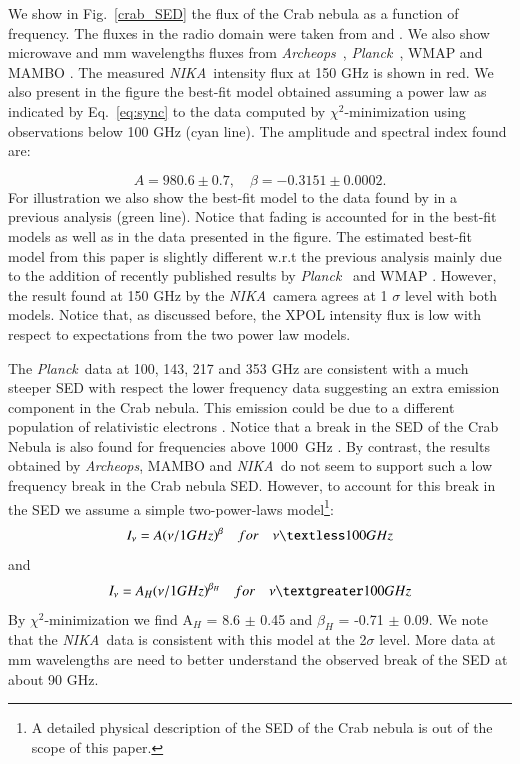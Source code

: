 \documentclass[twocolumn,traditabstract]{aa}
\def\NIKA{\textit{NIKA}}
\def\Archeops{\textit{Archeops}}
\def\Planck{\textit{Planck}}
\begin{document}
We show in Fig.~\ref{crab_SED} the flux of the Crab nebula as a function of frequency. The fluxes in the radio domain were taken from \cite{dmitrenko1970absolute} and \cite{1971IzVUZ..14..157V}. We also show microwave and mm wavelengths fluxes from \Archeops\ \citep{macias2007archeops}, \Planck\ \citep{2015arXiv150702058P}, WMAP \citep{2011ApJS..192...19W} and MAMBO \citep{2002A&A...386.1044B}. The measured \NIKA\ intensity flux at 150 GHz is shown in red.
We also present in the figure the best-fit model obtained assuming a power law as indicated by Eq.~\ref{eq:sync} to the data computed by $\chi^2$-minimization using observations below 100 GHz (cyan line). The amplitude and spectral index found are: 

\begin{equation}
 A = 980.6 \pm 0.7  ,\quad \beta = -0.3151 \pm 0.0002. 
 \end{equation}
 For illustration we also show the best-fit model to the data found by \cite{macias2010} in a previous analysis (green line). 
Notice that fading is accounted for in the best-fit models as well as in the data presented in the figure.
The estimated best-fit model from this paper is slightly different w.r.t the previous analysis mainly due to the addition of recently published results by \Planck\ \citep{2015arXiv150702058P} and  WMAP \citep{2011ApJS..192...19W}. However, the result found at 150 GHz by the \NIKA\ camera agrees at 1 $\sigma$ level with both models. 
Notice that, as discussed before, the XPOL intensity flux is low with respect to expectations from the two power law models. 
 
The \Planck\ data at 100, 143, 217 and 353 GHz are consistent with a much
steeper SED with respect the lower frequency data suggesting an extra emission
component in the Crab nebula. This emission could be due to a different
population of relativistic electrons \citep{1965ARA&A...3..297G}. Notice that a
break in the SED of the Crab Nebula is also found for frequencies above 1000~GHz
\citep{macias2010}.  By contrast, the results obtained by {\it Archeops}, MAMBO
and \NIKA\ do not seem to support such a low frequency break in the Crab nebula
SED. However, to account for this break in the SED we assume a simple
two-power-laws model\footnote{A detailed physical description of the SED of the
  Crab nebula is out of the scope of this paper.}:
\begin{equation}
I_{\nu} = A(\nu/1GHz)^{\beta} \quad for \quad \nu   \textless  100 GHz
\end{equation}
and 
\begin{equation}
I_{\nu} = A_{H}(\nu/1GHz)^{\beta_H} \quad for \quad \nu   \textgreater  100 GHz
\end{equation}
By $\chi^2$-minimization we find
A$_H$ = 8.6 $\pm$ 0.45 and $\beta_H$ = -0.71 $\pm$ 0.09.
We note that the \NIKA\ data is consistent with this model at the 2$\sigma$ level. More data at mm wavelengths are need to better understand the observed break of the SED at about 90 GHz. 
\end{document}
